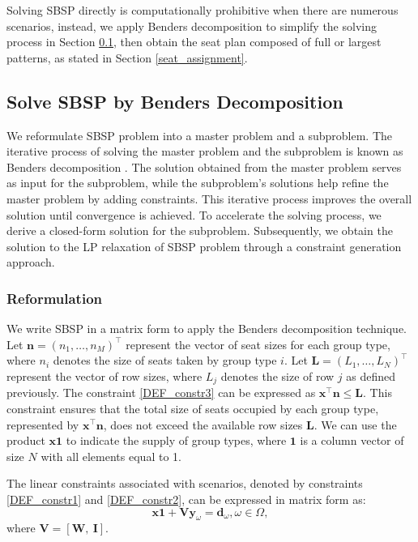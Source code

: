 Solving SBSP directly is computationally prohibitive when there are numerous scenarios, instead, we apply Benders decomposition to simplify the solving process in Section \ref{solve_by_benders}, then obtain the seat plan composed of full or largest patterns, as stated in Section \ref{seat_assignment}.

\subsection{Solve SBSP by Benders Decomposition}\label{solve_by_benders}
We reformulate SBSP problem into a master problem and a subproblem. The iterative process of solving the master problem and the subproblem is known as Benders decomposition \cite{bnnobrs1962partitioning}. 
The solution obtained from the master problem serves as input for the subproblem, while the subproblem's solutions help refine the master problem by adding constraints. This iterative process improves the overall solution until convergence is achieved. To accelerate the solving process, we derive a closed-form solution for the subproblem. Subsequently, we obtain the solution to the LP relaxation of SBSP problem through a constraint generation approach.


\subsubsection{Reformulation}
We write SBSP in a matrix form to apply the Benders decomposition technique. Let $\mathbf{n} = (n_1, \ldots, n_M)^{\intercal}$ represent the vector of seat sizes for each group type, where $n_i$ denotes the size of seats taken by group type $i$. Let $\mathbf{L} = (L_1, \ldots, L_N)^{\intercal}$ represent the vector of row sizes, where $L_j$ denotes the size of row $j$ as defined previously.
The constraint \eqref{DEF_constr3} can be expressed as $\mathbf{x}^{\intercal} \mathbf{n} \leq \mathbf{L}$. This constraint ensures that the total size of seats occupied by each group type, represented by $\mathbf{x}^{\intercal} \mathbf{n}$, does not exceed the available row sizes $\mathbf{L}$. We can use the product $\mathbf{x} \mathbf{1}$ to indicate the supply of group types, where $\mathbf{1}$ is a column vector of size $N$ with all elements equal to 1. 

The linear constraints associated with scenarios, denoted by constraints \eqref{DEF_constr1} and \eqref{DEF_constr2}, can be expressed in matrix form as:
\[\mathbf{x} \mathbf{1} + \mathbf{V} \mathbf{y}_\omega = \mathbf{d}_\omega, \omega\in \Omega,\]
where $\mathbf{V} = [\mathbf{W}, ~\mathbf{I}]$.

